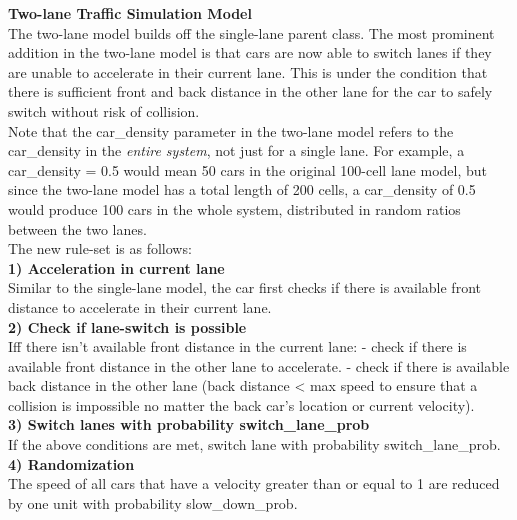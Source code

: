 \documentclass[11pt]{article}
\begin{document}
\textbf{Two-lane Traffic Simulation Model}\\

The two-lane model builds off the single-lane parent class. The most
prominent addition in the two-lane model is that cars are now able to
switch lanes if they are unable to accelerate in their current lane.
This is under the condition that there is sufficient front and back
distance in the other lane for the car to safely switch without risk of
collision.\\

Note that the car\_density parameter in the two-lane model refers to the
car\_density in the \emph{entire system}, not just for a single lane.
For example, a car\_density = 0.5 would mean 50 cars in the original
100-cell lane model, but since the two-lane model has a total length of
200 cells, a car\_density of 0.5 would produce 100 cars in the whole
system, distributed in random ratios between the two lanes.\\

The new rule-set is as follows:\\

\textbf{1) Acceleration in current lane}\\

Similar to the single-lane model, the car first checks if there is
available front distance to accelerate in their current lane.\\

\textbf{2) Check if lane-switch is possible}\\

Iff there isn't available front distance in the current lane: - check if
there is available front distance in the other lane to accelerate. -
check if there is available back distance in the other lane (back
distance \textless{} max speed to ensure that a collision is impossible
no matter the back car's location or current velocity).\\

\textbf{3) Switch lanes with probability switch\_lane\_prob}\\

If the above conditions are met, switch lane with probability
switch\_lane\_prob.\\

\textbf{4) Randomization}\\

The speed of all cars that have a velocity greater than or equal to 1
are reduced by one unit with probability slow\_down\_prob.\\
\end{document}
